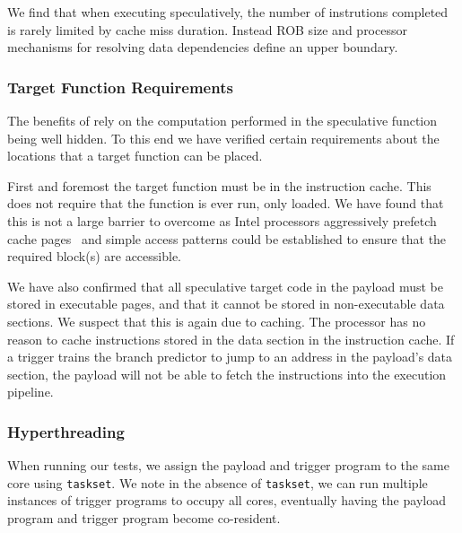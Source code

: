 \medskip

We find that when executing speculatively, the number of instrutions completed
is rarely limited by cache miss duration. Instead
ROB size and processor mechanisms for resolving
data dependencies define an upper boundary.


\subsubsection{Target Function Requirements}
The benefits of \speculake rely on the computation performed in the
speculative function being well hidden. To this end we have verified 
certain requirements about the locations that a target function can 
be placed. 

First and foremost the target function must be in the instruction cache. 
This does not require that the function is ever run, only loaded. We have 
found that this is not a large barrier to overcome as Intel 
processors aggressively prefetch cache pages~\cite{measuring-cache}
and simple access patterns could be established to ensure
that the required block(s) are accessible. 

We have also confirmed that all speculative target code in the payload must be
stored in executable pages, and that it cannot be stored in non-executable data
sections.  We suspect that this is again due to caching. The processor has no
reason to cache instructions stored in the data section in the instruction
cache. If a trigger trains the branch predictor to jump to an address in the
payload's data section, the payload will not be able to fetch the instructions
into the execution pipeline. 

\subsubsection{Hyperthreading}

When running our tests, we assign the payload and trigger program to the same
core using \texttt{taskset}. We note in the absence of \texttt{taskset}, we can
run multiple instances of trigger programs to occupy all cores, eventually
having the payload program and trigger program become co-resident.

